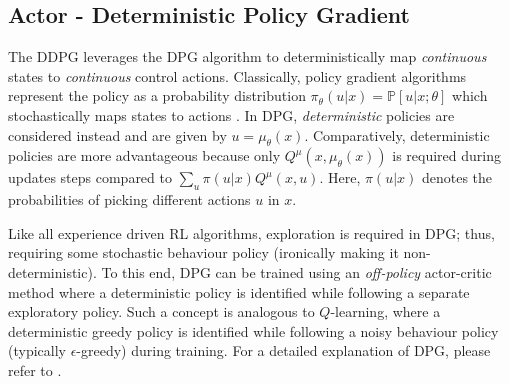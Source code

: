 \subsection{Actor - Deterministic Policy Gradient}
The DDPG leverages the DPG algorithm to deterministically map \textit{continuous} states to \textit{continuous} control actions.  Classically, policy gradient algorithms represent the policy as a probability distribution $\pi_{\theta}(u|x) = \mathbb{P}[u|x; \theta]$ which stochastically maps states to actions \cite{dpg}.  In DPG, \textit{deterministic} policies are considered instead and are given by $u = \mu_{\theta}(x)$. Comparatively, deterministic policies are more advantageous because only $Q^{\mu}(x, \mu_{\theta}(x))$ is required during updates steps compared to $\sum\limits_u \pi(u|x)Q^{\mu}(x, u)$. Here, $\pi(u|x)$ denotes the probabilities of picking different actions $u$ in $x$.

Like all experience driven RL algorithms, exploration is required in DPG; thus, requiring some stochastic behaviour policy (ironically making it non-deterministic). To this end, DPG can be trained using an \textit{off-policy} actor-critic method where a deterministic policy is identified while following a separate exploratory policy.  Such a concept is analogous to $Q$-learning, where a deterministic greedy policy is identified while following a noisy behaviour policy (typically $\epsilon$-greedy) during training. For a detailed explanation of DPG, please refer to \cite{dpg}.


